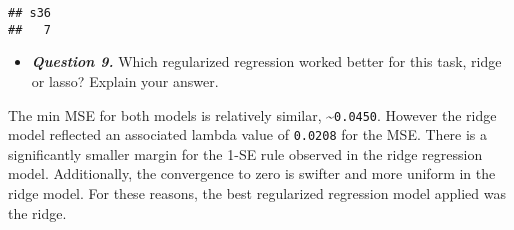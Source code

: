\documentclass[
]{article}
\providecommand{\tightlist}{%
  \setlength{\itemsep}{0pt}\setlength{\parskip}{0pt}}
\begin{document}
\begin{verbatim}
## s36 
##   7
\end{verbatim}

\begin{itemize}
\tightlist
\item
  \textbf{\emph{Question 9.}} Which regularized regression worked better
  for this task, ridge or lasso? Explain your answer.
\end{itemize}

The min MSE for both models is relatively similar,
\textasciitilde{}\texttt{0.0450}. However the ridge model reflected an
associated lambda value of \texttt{0.0208} for the MSE. There is a
significantly smaller margin for the 1-SE rule observed in the ridge
regression model. Additionally, the convergence to zero is swifter and
more uniform in the ridge model. For these reasons, the best regularized
regression model applied was the ridge.
\end{document}
